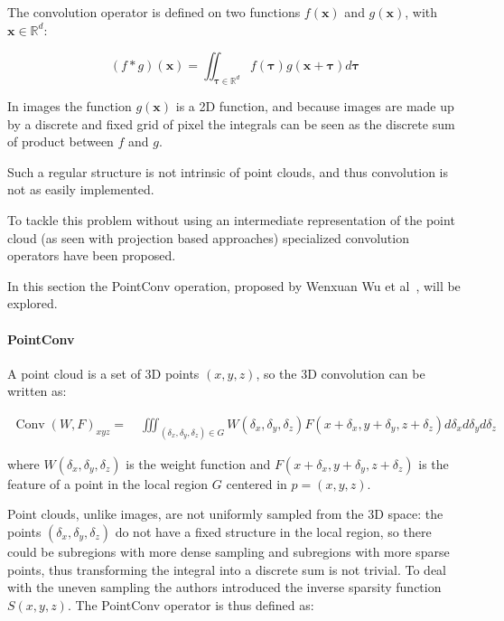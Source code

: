 The convolution operator is defined on two functions $f(\mathbf{x})$ and $g(\mathbf{x})$, with $\mathbf{x} \in \mathbb{R}^{d}$: 

\begin{equation}
    (f * g)(\mathbf{x})=\iint_{\boldsymbol{\tau} \in \mathbb{R}^{d}} f(\boldsymbol{\tau}) g(\mathbf{x}+\boldsymbol{\tau}) d \boldsymbol{\tau}
\end{equation}

In images the function $g(\mathbf{x})$ is a 2D function, and because images are made up by a discrete and fixed grid of pixel the integrals can be seen as the discrete sum of product between $f$ and $g$.

Such a regular structure is not intrinsic of point clouds, and thus convolution is not as easily implemented.

To tackle this problem without using an intermediate representation of the point cloud (as seen with projection based approaches) specialized convolution operators have been proposed.

In this section the PointConv operation, proposed by Wenxuan Wu et al~\cite{PointConv}, will be explored.

\paragraph{PointConv}

A point cloud is a set of 3D points $(x,y,z)$, so the 3D convolution can be written as: 

\begin{equation}
    \begin{array}{l}
\operatorname{Conv}(W, F)_{x y z}= 
\quad \iiint_{\left(\delta_{x}, \delta_{y}, \delta_{z}\right) \in G} W\left(\delta_{x}, \delta_{y}, \delta_{z}\right) F\left(x+\delta_{x}, y+\delta_{y}, z+\delta_{z}\right) d \delta_{x} d \delta_{y} d \delta_{z}
\end{array}
\end{equation}

where $W(\delta_{x}, \delta_{y}, \delta_{z})$ is the weight function and $F\left(x+\delta_{x}, y+\delta_{y}, z+\delta_{z}\right)$ is the feature of a point in the local region $G$ centered in  $p = (x,y,z)$.

Point clouds, unlike images, are not uniformly sampled from the 3D space: the points $(\delta_{x}, \delta_{y}, \delta_{z})$ do not have a fixed structure in the local region, so there could be subregions with more dense sampling and subregions with more sparse points, thus transforming the integral into a discrete sum is not trivial.
To deal with the uneven sampling the authors introduced the inverse sparsity function $S(x,y,z)$. The PointConv operator is thus defined as:

